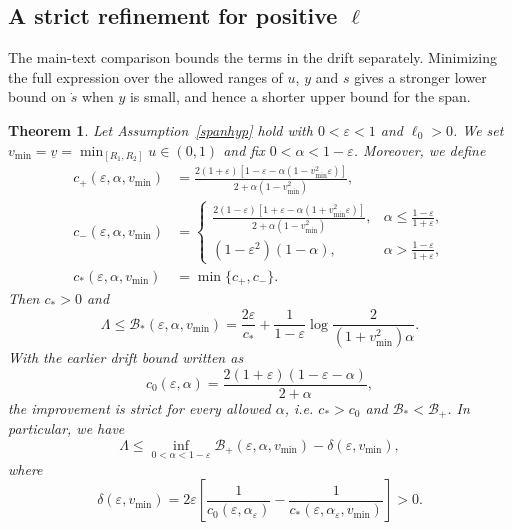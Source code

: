 \documentclass[amsmath,amsfonts,amssymb,aps,pra,superscriptaddress,10pt]{revtex4-2}
\numberwithin{equation}{section}
\theoremstyle{plain}
\newtheorem{theorem}{Theorem}
\theoremstyle{definition}
\theoremstyle{remark}
\theoremstyle{definition}
\newcommand{\ellzero}{\ell_0}
\begin{document}
\subsection{A strict refinement for positive \texorpdfstring{$\ell$}{ell}}

The main-text comparison bounds the terms in the drift separately. Minimizing the full expression over the allowed ranges of $u$, $y$ and $s$ gives a stronger lower bound on $\dot{s}$ when $y$ is small, and hence a shorter upper bound for the span.

\begin{theorem}
Let Assumption~\ref{spanhyp} hold with $0<\varepsilon<1$ and $\ellzero>0$. We set $v_{\min}=\underline{v}=\min_{[R_1,R_2]}u\in(0,1)$ and fix $0<\alpha<1-\varepsilon$. Moreover, we define
\begin{align}
c_+(\varepsilon,\alpha,v_{\min})&=\frac{2(1+\varepsilon)
[1-\varepsilon-\alpha(1-v_{\min}^2\varepsilon)]}
{2+\alpha(1-v_{\min}^2)},\\
c_-(\varepsilon,\alpha,v_{\min})&=\begin{cases}
\displaystyle
\frac{2(1-\varepsilon)
[1+\varepsilon-\alpha(1+v_{\min}^2\varepsilon)]}
{2+\alpha(1-v_{\min}^2)},
&\displaystyle\alpha\leqslant\frac{1-\varepsilon}{1+\varepsilon},\\[3mm]
(1-\varepsilon^2)(1-\alpha),
&\displaystyle\alpha>\frac{1-\varepsilon}{1+\varepsilon},
\end{cases}\label{cminref}\\
c_*(\varepsilon,\alpha,v_{\min})&=\min\{c_+,c_-\}.
\end{align}
Then $c_*>0$ and
\begin{equation}\label{refposbound}
\Lambda\leq\mathcal{B}_*(\varepsilon,\alpha,v_{\min})=\frac{2\varepsilon}{c_*}+\frac{1}{1-\varepsilon}\log{\frac{2}{(1+v_{\min}^2)\alpha}}.
\end{equation}
With the earlier drift bound written as
\begin{equation}
c_0(\varepsilon,\alpha)=\frac{2(1+\varepsilon)(1-\varepsilon-\alpha)}{2+\alpha},
\end{equation}
the improvement is strict for every allowed $\alpha$, i.e. $c_*>c_0$ and $\mathcal{B}_*<\mathcal{B}_+$. In particular, we have
\begin{equation}
\Lambda\leq\inf_{0<\alpha<1-\varepsilon}\mathcal{B}_+(\varepsilon,\alpha,v_{\min})-\delta(\varepsilon,v_{\min}),
\end{equation}
where
\begin{equation}
\delta(\varepsilon,v_{\min})=2\varepsilon\left[\frac{1}{c_0(\varepsilon,\alpha_\varepsilon)}-\frac{1}{c_*(\varepsilon,\alpha_\varepsilon,v_{\min})}\right]>0.
\end{equation}
\end{theorem}
\end{document}
